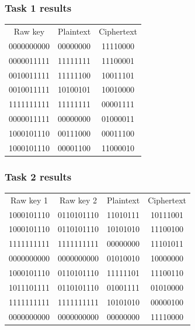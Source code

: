 \documentclass[12pt, letterpaper]{article}
\begin{document}
\subsubsection*{Task 1 results}
\begin{center}
\begin{tabular}{ |c|c|c| } 
 \hline
 Raw key & Plaintext & Ciphertext \\
 0000000000 & 00000000 & 11110000 \\ 
 0000011111 & 11111111 & 11100001 \\ 
 0010011111 & 11111100 & 10011101 \\ 
 0010011111 & 10100101 & 10010000 \\ 
 1111111111 & 11111111 & 00001111 \\
 0000011111 & 00000000 & 01000011 \\
 1000101110 & 00111000 & 00011100 \\
 1000101110 & 00001100 & 11000010 \\
 \hline
\end{tabular}
\end{center}

\subsubsection*{Task 2 results}
\begin{center}
\begin{tabular}{ |c|c|c|c| } 
 \hline
 Raw key 1 & Raw key 2 & Plaintext & Ciphertext \\
1000101110 & 0110101110 & 11010111 & 10111001 \\
1000101110 & 0110101110 & 10101010 & 11100100 \\
1111111111 & 1111111111 & 00000000 & 11101011 \\
0000000000 & 0000000000 & 01010010 & 10000000 \\
1000101110 & 0110101110 & 11111101 & 11100110 \\
1011101111 & 0110101110 & 01001111 & 01010000 \\
1111111111 & 1111111111 & 10101010 & 00000100 \\
0000000000 & 0000000000 & 00000000 & 11110000\\
 \hline
\end{tabular} 
\end{center} 
\end{document}
